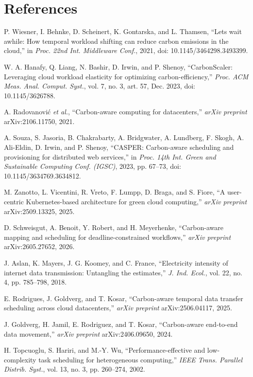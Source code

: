 \documentclass[12pt,a4paper,oneside,openany]{report}
\begin{document}
\chapter*{References}
\sloppy
\begin{enumerate}[label={[\arabic*]}, leftmargin=2.6em, labelsep=0.6em, itemsep=4pt]
\item P. Wiesner, I. Behnke, D. Scheinert, K. Gontarska, and L. Thamsen, ``Let\textquotesingle s wait awhile: How temporal workload shifting can reduce carbon emissions in the cloud,'' in \emph{Proc. 22nd Int. Middleware Conf.}, 2021, doi: 10.1145/3464298.3493399.
\item W. A. Hanafy, Q. Liang, N. Bashir, D. Irwin, and P. Shenoy, ``CarbonScaler: Leveraging cloud workload elasticity for optimizing carbon-efficiency,'' \emph{Proc. ACM Meas. Anal. Comput. Syst.}, vol. 7, no. 3, art. 57, Dec. 2023, doi: 10.1145/3626788.
\item A. Radovanović \emph{et al.}, ``Carbon-aware computing for datacenters,'' \emph{arXiv preprint} arXiv:2106.11750, 2021.
\item A. Souza, S. Jasoria, B. Chakrabarty, A. Bridgwater, A. Lundberg, F. Skogh, A. Ali-Eldin, D. Irwin, and P. Shenoy, ``CASPER: Carbon-aware scheduling and provisioning for distributed web services,'' in \emph{Proc. 14th Int. Green and Sustainable Computing Conf. (IGSC)}, 2023, pp. 67--73, doi: 10.1145/3634769.3634812.
\item M. Zanotto, L. Vicentini, R. Vreto, F. Lumpp, D. Braga, and S. Fiore, ``A user-centric Kubernetes-based architecture for green cloud computing,'' \emph{arXiv preprint} arXiv:2509.13325, 2025.
\item D. Schweisgut, A. Benoit, Y. Robert, and H. Meyerhenke, ``Carbon-aware mapping and scheduling for deadline-constrained workflows,'' \emph{arXiv preprint} arXiv:2605.27652, 2026.
\item J. Aslan, K. Mayers, J. G. Koomey, and C. France, ``Electricity intensity of internet data transmission: Untangling the estimates,'' \emph{J. Ind. Ecol.}, vol. 22, no. 4, pp. 785--798, 2018.
\item E. Rodrigues, J. Goldverg, and T. Kosar, ``Carbon-aware temporal data transfer scheduling across cloud datacenters,'' \emph{arXiv preprint} arXiv:2506.04117, 2025.
\item J. Goldverg, H. Jamil, E. Rodriguez, and T. Kosar, ``Carbon-aware end-to-end data movement,'' \emph{arXiv preprint} arXiv:2406.09650, 2024.
\item H. Topcuoglu, S. Hariri, and M.-Y. Wu, ``Performance-effective and low-complexity task scheduling for heterogeneous computing,'' \emph{IEEE Trans. Parallel Distrib. Syst.}, vol. 13, no. 3, pp. 260--274, 2002.

\end{enumerate}
\end{document}
